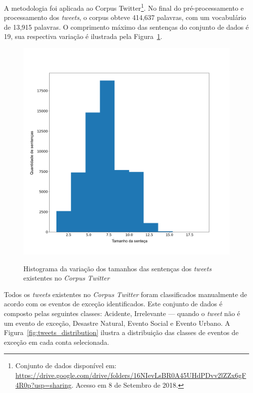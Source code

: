 \documentclass[
	12pt,				%
	oneside,			%
	a4paper,			%
	english,			%
	brazil				%
	]{abntex2ppgsi}
\begin{document}
{{{A metodologia foi aplicada ao Corpus Twitter\footnote{Conjunto de dados disponível em: \url{https://drive.google.com/drive/folders/16NIevLsBR0A45UHdPDvv2lZZx6gF4R0p?usp=sharing}. Acesso em 8 de Setembro de 2018.}. No final do pré-processamento e processamento dos \textit{tweets}, o corpus obteve 414,637 palavras, com um vocabulário de 13,915 palavras. O comprimento máximo das sentenças do conjunto de dados é 19, sua respectiva variação é ilustrada pela Figura~\ref{fig:corpus_metrics}.
 
\begin{figure}[!htb]
	\centering
 	  \caption{Histograma da variação dos tamanhos das sentenças dos \textit{tweets} existentes no \textit{Corpus Twitter}}
		\includegraphics[width=1\linewidth]{images/corpus_metrics_pt.png}
	\label{fig:corpus_metrics}
\end{figure}

Todos os \textit{tweets} existentes no \textit{Corpus Twitter} foram classificados manualmente de acordo com os eventos de exceção identificados. Este conjunto de dados é composto pelas seguintes classes: Acidente, Irrelevante --- quando o \textit{tweet} não é um evento de exceção, Desastre Natural, Evento Social e Evento Urbano. A Figura~\ref{fig:tweets_distribution} ilustra a distribuição das classes de eventos de exceção em cada conta selecionada.

}}}
\end{document}
